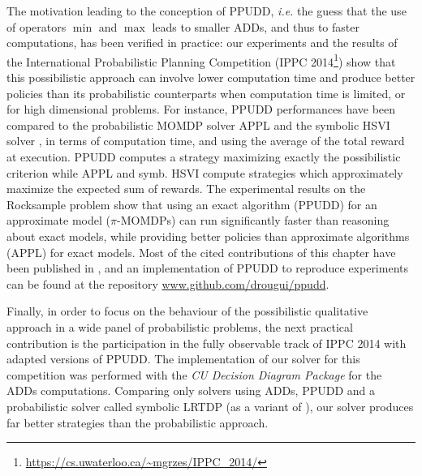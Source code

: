 The motivation leading to the conception of PPUDD,
\textit{i.e.} the guess that the use of operators $\min$ and $\max$ 
leads to smaller ADDs, and thus to faster computations,
has been verified in practice:
our experiments and the results 
of the International Probabilistic Planning Competition (IPPC 2014\footnote{\url{https://cs.uwaterloo.ca/~mgrzes/IPPC_2014/}})
show that this possibilistic approach
can involve lower computation time
and produce better policies
than its probabilistic counterparts
when computation time is limited,
or for high dimensional problems.
For instance, 
PPUDD performances have been compared 
to the probabilistic MOMDP solver APPL \cite{Kurniawati-RSS08,OngShaoHsuWee-IJRR10}
and the symbolic HSVI solver \cite{Sim:2008:SHS:1620163.1620241},
in terms of computation time, 
and using the average of 
the total reward at execution. 
PPUDD computes a strategy maximizing 
exactly the possibilistic criterion 
while APPL and symb. HSVI compute strategies
which approximately maximize the expected sum of rewards.
The experimental results on the Rocksample problem 
show that using an exact algorithm 
(PPUDD) for an approximate model ($\pi$-MOMDPs) 
can run significantly faster 
than reasoning about exact models, 
while providing better policies 
than approximate algorithms (APPL) 
for exact models.
Most of the cited contributions of this chapter
have been published in \cite{DBLP:conf/aaai/DrougardTFD14},
and an implementation of PPUDD 
to reproduce experiments 
can be found 
at the repository \url{www.github.com/drougui/ppudd}.

Finally, in order to focus on the behaviour 
of the possibilistic qualitative approach 
in a wide panel of probabilistic problems, 
the next practical contribution 
is the participation 
in the fully observable track of IPPC 2014
with adapted versions of PPUDD.
The implementation of our solver for this competition 
was performed with the \textit{CU Decision Diagram Package}
for the ADDs computations. 
Comparing only solvers using ADDs, 
PPUDD and a probabilistic solver 
called symbolic LRTDP \cite{symbLRTDP}
(as a variant of \cite{Bonet03labeledrtdp}),
our solver produces far better strategies 
than the probabilistic approach.

